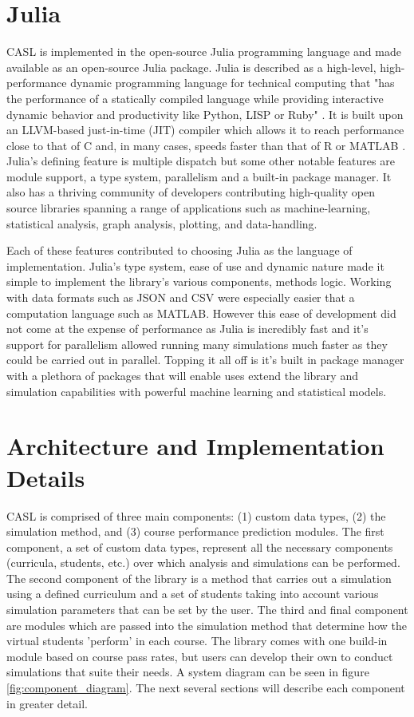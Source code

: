 \documentclass[botnum, fleqn]{unmeethesis}
\begin{document}
  \section{Julia}
    CASL is implemented in the open-source Julia programming language and made available as an open-source Julia package. Julia is described as a high-level, high-performance dynamic programming language for technical computing that "has the performance of a statically compiled language while providing interactive dynamic behavior and productivity like Python, LISP or Ruby" \cite{Julia}. It is built upon an LLVM-based just-in-time (JIT) compiler which allows it to reach performance close to that of C and, in many cases, speeds faster than that of R or MATLAB \cite{Julia}. Julia's defining feature is multiple dispatch but some other notable features are module support, a type system, parallelism and a built-in package manager. It also has a thriving community of developers contributing high-quality open source libraries spanning a range of applications such as machine-learning, statistical analysis, graph analysis, plotting, and data-handling.

    Each of these features contributed to choosing Julia as the language of implementation. Julia's type system, ease of use and dynamic nature made it simple to implement the library's various components, methods logic. Working with data formats such as JSON and CSV were especially easier that a computation language such as MATLAB. However this ease of development did not come at the expense of performance as Julia is incredibly fast and it's support for parallelism allowed running many simulations much faster as they could be carried out in parallel. Topping it all off is it's built in package manager with a plethora of packages that will enable uses extend the library and simulation capabilities with powerful machine learning and statistical models.

  
  \section{Architecture and Implementation Details}
    CASL is comprised of three main components: (1) custom data types, (2) the simulation method, and (3) course performance prediction modules. The first component, a set of custom data types, represent all the necessary components (curricula, students, etc.) over which analysis and simulations can be performed. The second component of the library is a method that carries out a simulation using a defined curriculum and a set of students taking into account various simulation parameters that can be set by the user. The third and final component are modules which are passed into the simulation method that determine how the virtual students 'perform' in each course. The library comes with one build-in module based on course pass rates, but users can develop their own to conduct simulations that suite their needs. A system diagram can be seen in figure \ref{fig:component_diagram}. The next several sections will describe each component in greater detail.
\end{document}
